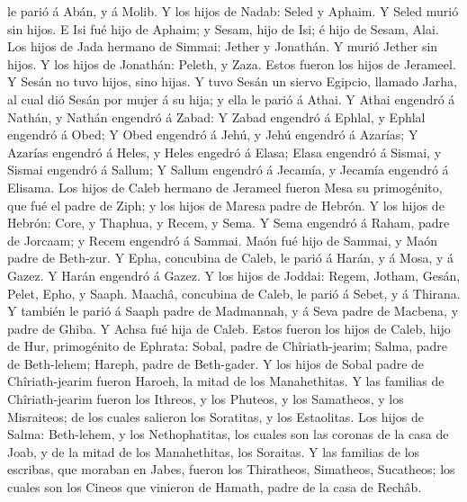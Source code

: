 le parió á Abán, y á Molib.  Y los hijos de Nadab: Seled
y Aphaim. Y Seled murió sin hijos.  E Isi fué hijo de
Aphaim; y Sesam, hijo de Isi; é hijo de Sesam, Alai.  Los
hijos de Jada hermano de Simmai: Jether y Jonathán. Y murió Jether sin
hijos.  Y los hijos de Jonathán: Peleth, y Zaza. Estos
fueron los hijos de Jerameel.  Y Sesán no tuvo hijos,
sino hijas.  Y tuvo Sesán un siervo Egipcio, llamado
Jarha, al cual dió Sesán por mujer á su hija; y ella le parió á Athai.
 Y Athai engendró á Nathán, y Nathán engendró á Zabad:
 Y Zabad engendró á Ephlal, y Ephlal engendró á Obed;
 Y Obed engendró á Jehú, y Jehú engendró á Azarías;
 Y Azarías engendró á Heles, y Heles engedró á Elasa;
 Elasa engendró á Sismai, y Sismai engendró á Sallum;
 Y Sallum engendró á Jecamía, y Jecamía engendró á
Elisama.  Los hijos de Caleb hermano de Jerameel fueron
Mesa su primogénito, que fué el padre de Ziph; y los hijos de Maresa
padre de Hebrón.  Y los hijos de Hebrón: Core, y Thaphua,
y Recem, y Sema.  Y Sema engendró á Raham, padre de
Jorcaam; y Recem engendró á Sammai.  Maón fué hijo de
Sammai, y Maón padre de Beth-zur.  Y Epha, concubina de
Caleb, le parió á Harán, y á Mosa, y á Gazez. Y Harán engendró á Gazez.
 Y los hijos de Joddai: Regem, Jotham, Gesán, Pelet,
Epho, y Saaph.  Maachâ, concubina de Caleb, le parió á
Sebet, y á Thirana.  Y también le parió á Saaph padre de
Madmannah, y á Seva padre de Macbena, y padre de Ghiba. Y Achsa fué hija
de Caleb.  Estos fueron los hijos de Caleb, hijo de Hur,
primogénito de Ephrata: Sobal, padre de Chîriath-jearim; 
Salma, padre de Beth-lehem; Hareph, padre de Beth-gader. 
Y los hijos de Sobal padre de Chîriath-jearim fueron Haroeh, la mitad de
los Manahethitas.  Y las familias de Chîriath-jearim
fueron los Ithreos, y los Phuteos, y los Samatheos, y los Misraiteos; de
los cuales salieron los Soratitas, y los Estaolitas.  Los
hijos de Salma: Beth-lehem, y los Nethophatitas, los cuales son las
coronas de la casa de Joab, y de la mitad de los Manahethitas, los
Soraitas.  Y las familias de los escribas, que moraban en
Jabes, fueron los Thiratheos, Simatheos, Sucatheos; los cuales son los
Cineos que vinieron de Hamath, padre de la casa de Rechâb.

